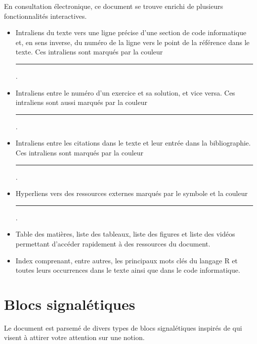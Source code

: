 En consultation électronique, ce document se trouve enrichi de
plusieurs fonctionnalités interactives.
\begin{itemize}
\item Intraliens du texte vers une ligne précise d'une section de code
  informatique et, en sens inverse, du numéro de la ligne vers le
  point de la référence dans le texte. Ces intraliens sont marqués par
  la couleur \textcolor{link}{\rule{1.5em}{1.2ex}}.
\item Intraliens entre le numéro d'un exercice et sa solution, et vice
  versa. Ces intraliens sont aussi marqués par la couleur
  \textcolor{link}{\rule{1.5em}{1.2ex}}.
\item Intraliens entre les citations dans le texte et leur entrée dans
  la bibliographie. Ces intraliens sont marqués par la couleur
  \textcolor{citation}{\rule{1.5em}{1.2ex}}.
\item Hyperliens vers des ressources externes marqués par le symbole
  {\smaller\faExternalLink*} et la couleur
  \textcolor{url}{\rule{1.5em}{1.2ex}}.
\item Table des matières, liste des tableaux, liste des figures et
  liste des vidéos permettant d'accéder rapidement à des ressources du
  document.
\item Index comprenant, entre autres, les principaux mots clés du
  langage R et toutes leurs occurrences dans le texte ainsi que
  dans le code informatique.
\end{itemize}

\section*{Blocs signalétiques}

Le document est parsemé de divers types de blocs signalétiques
inspirés de
qui visent à attirer votre attention sur une notion.

\vspace{-\baselineskip}

\vspace{-\baselineskip}

\vspace{-\baselineskip}

